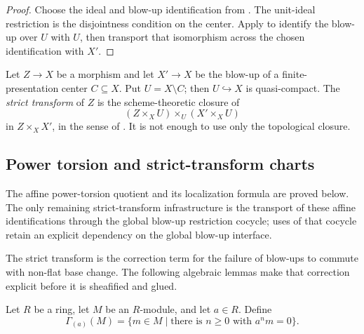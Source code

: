 \begin{proof}
  Choose the ideal and blow-up identification from
  .  The unit-ideal restriction is the
  disjointness condition on the center.  Apply
   to identify the blow-up over $U$
  with $U$, then transport that isomorphism across the chosen identification
  with $X'$.
\end{proof}

\begin{definition}
  \label{def:nagata-strict-transform}

  Let $Z\to X$ be a morphism and let $X'\to X$ be the blow-up of a
  finite-presentation center $C\subseteq X$.  Put $U=X\setminus C$; then
  $U\hookrightarrow X$ is quasi-compact.  The \emph{strict transform} of $Z$
  is the scheme-theoretic closure of
  \[
    (Z\times_XU)\times_U(X'\times_XU)
  \]
  in $Z\times_XX'$, in the sense of
  .  It is not enough to use only
  the topological closure.
\end{definition}

\subsection{Power torsion and strict-transform charts}

The affine power-torsion quotient and its localization formula are proved
below.  The only remaining strict-transform infrastructure is the transport
of these affine identifications through the global blow-up restriction
cocycle; uses of that cocycle retain an explicit dependency on the global
blow-up interface.

The strict transform is the correction term for the failure of blow-ups to
commute with non-flat base change.  The following algebraic lemmas make that
correction explicit before it is sheafified and glued.

\begin{definition}
  \label{def:nagata-power-torsion}

  Let $R$ be a ring, let $M$ be an $R$-module, and let $a\in R$.  Define
  \[
    \Gamma_{(a)}(M)
      =\{m\in M\mid \text{there is }n\geq0\text{ with }a^nm=0\}.
  \]
\end{definition}

